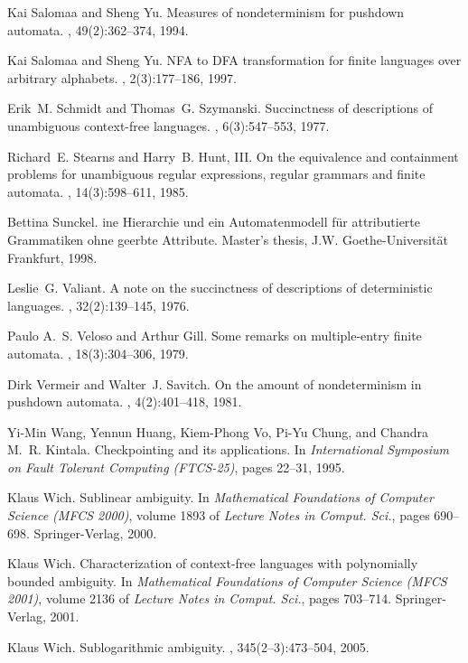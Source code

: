 \documentclass[copyright]{eptcs}
\begin{document}
\begin{thebibliography}{10}
Kai Salomaa and Sheng Yu.
\newblock Measures of nondeterminism for pushdown automata.
, 49(2):362--374, 1994.

Kai Salomaa and Sheng Yu.
\newblock N{F}{A} to {D}{F}{A} transformation for finite languages over
  arbitrary alphabets.
, 2(3):177--186, 1997.

Erik~M. Schmidt and Thomas~G. Szymanski.
\newblock Succinctness of descriptions of unambiguous context-free languages.
, 6(3):547--553, 1977.

Richard~E. Stearns and Harry~B. Hunt, III.
\newblock On the equivalence and containment problems for unambiguous regular
  expressions, regular grammars and finite automata.
, 14(3):598--611, 1985.

Bettina Sunckel.
ine {H}ierarchie und ein {A}utomatenmodell f{\"u}r attributierte
  {G}rammatiken ohne geerbte {A}ttribute.
\newblock Master's thesis, J.W. Goethe-Universit{\"a}t Frankfurt, 1998.

Leslie~G. Valiant.
\newblock A note on the succinctness of descriptions of deterministic
  languages.
, 32(2):139--145, 1976.

Paulo A.~S. Veloso and Arthur Gill.
\newblock Some remarks on multiple-entry finite automata.
, 18(3):304--306, 1979.

Dirk Vermeir and Walter~J. Savitch.
\newblock On the amount of nondeterminism in pushdown automata.
, 4(2):401--418, 1981.

Yi-Min Wang, Yennun Huang, Kiem-Phong Vo, Pi-Yu Chung, and Chandra M.~R.
  Kintala.
\newblock Checkpointing and its applications.
\newblock In {\em International Symposium on Fault Tolerant Computing
  (FTCS-25)}, pages 22--31, 1995.

Klaus Wich.
\newblock Sublinear ambiguity.
\newblock In {\em Mathematical Foundations of Computer Science ({MFCS} 2000)},
  volume 1893 of {\em Lecture Notes in Comput. Sci.}, pages 690--698.
  Springer-Verlag, 2000.

Klaus Wich.
\newblock Characterization of context-free languages with polynomially bounded
  ambiguity.
\newblock In {\em Mathematical Foundations of Computer Science ({MFCS} 2001)},
  volume 2136 of {\em Lecture Notes in Comput. Sci.}, pages 703--714.
  Springer-Verlag, 2001.

Klaus Wich.
\newblock Sublogarithmic ambiguity.
, 345(2--3):473--504, 2005.

\end{thebibliography}
\end{document}
